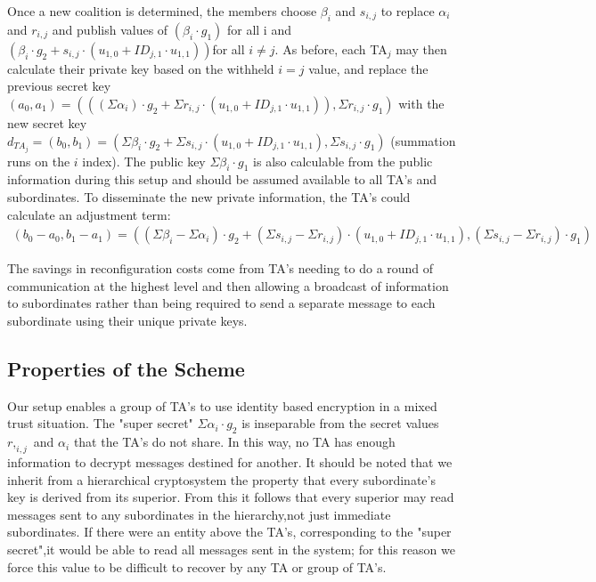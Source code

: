 \documentclass[10pt]{llncs}
\begin{document}
	Once a new coalition is determined, the members choose $\beta_i$ and $s_{i,j}$ to replace $\alpha_i$ and $r_{i,j}$ and publish values of $(\beta_i \cdot g_1)$ for all i and $(\beta_i \cdot g_2 + s_{i,j} \cdot (u_{1,0} + ID_{j,1}\cdot u_{1,1}))$for all $i \neq j$.  As before, each TA$_j$ may then calculate their private key based on the withheld $i = j$ value, and replace the previous secret key $(a_0, a_1) = (((\Sigma \alpha_i)\cdot g_2 + \Sigma r_{i,j} \cdot (u_{1,0} + ID_{j,1}\cdot u_{1,1})), \Sigma r_{i,j} \cdot g_1)$ with the new secret key $d_{TA_j} = (b_0, b_1) = (\Sigma \beta_i \cdot g_2
	 + \Sigma s_{i,j} \cdot (u_{1,0} + ID_{j,1}\cdot u_{1,1}), \Sigma s_{i,j} \cdot g_1)$ (summation runs on the $i$ index). The public key $\Sigma \beta_i \cdot g_1$ is also calculable from the public information during this setup and should be assumed available to all TA's and subordinates.   To disseminate the new private information, the TA's could calculate an adjustment term:
	\begin{align*}
	(b_0 - a_0, b_1 - a_1) = ((\Sigma \beta_i - \Sigma \alpha_i) \cdot g_2 + (\Sigma s_{i,j} - \Sigma r_{i,j})\cdot (u_{1,0} + ID_{j,1} \cdot u_{1,1}), (\Sigma s_{i,j} - \Sigma r_{i,j})\cdot g_1)
	\end{align*}

	The savings in reconfiguration costs come from TA’s needing to do a round of communication at the highest level and then allowing a broadcast of information to subordinates rather than being required to send a separate message to each subordinate using their unique private keys.

	\subsection{Properties of the Scheme}

	Our setup enables a group of TA's to use identity based encryption in a mixed trust situation. The "super secret" $\Sigma \alpha_i \cdot g_2$ is inseparable from the secret values $r,_{i,j}$ and $\alpha_i$ that the TA's do not share. In this way, no TA has enough information to decrypt messages destined for another.  It should be noted that we inherit from a hierarchical cryptosystem the property that every subordinate's key is derived from its superior. From this  it follows that every superior may read messages sent to any subordinates in the hierarchy,not just immediate subordinates.  If there were an entity above the TA's, corresponding to the "super secret",it would be able to read all messages sent in the system; for this reason we force this value to be difficult to recover by any TA or group of TA's.
\end{document}
